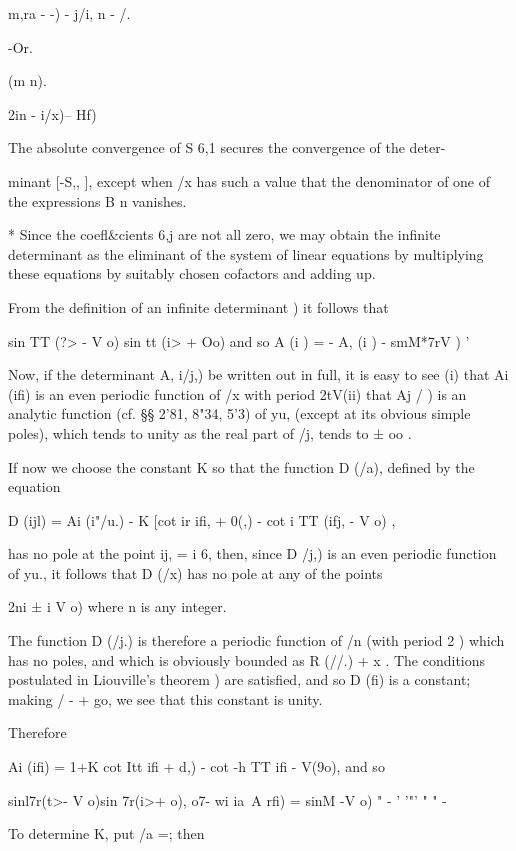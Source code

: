   m,ra - -) - j/i, n - /.

-Or.

(m n).

 2in - i/x)-- Hf)

The absolute convergence of S 6,1 secures the convergence of the
deter-

minant [-S,, ], except when /x has such a value that the denominator
of one of the expressions B n vanishes.

* Since the coefl\&cients 6,j are not all zero, we may obtain the
infinite determinant as the eliminant of the system of linear
equations by multiplying these equations by suitably chosen cofactors
and adding up.

%
%

From the definition of an infinite determinant ) it follows that

sin TT (?> - V o) sin tt (i> + \/Oo) and so A (i ) = - A, (i ) -
smM*7rV ) '

Now, if the determinant A, i/j,) be written out in full, it is easy to
see (i) that Ai (ifi) is an even periodic function of /x with period
2tV(ii) that Aj / ) is an analytic function (cf. §§ 2'81, 8"34, 5'3)
of yu, (except at its obvious simple poles), which tends to unity as
the real part of /j, tends to ± oo .

If now we choose the constant K so that the function D (/a), defined
by the equation

D (ijl) = Ai (i"/u.) - K [cot ir ifi, + \/0(,) - cot i TT (ifj, - V o)
,

has no pole at the point ij, = i 6, then, since D /j,) is an even
periodic function of yu., it follows that D (/x) has no pole at any of
the points

2ni ± i V o) where n is any integer.

The function D (/j.) is therefore a periodic function of /n (with
period 2 ) which has no poles, and which is obviously bounded as R
(//.) + x . The conditions postulated in Liouville's theorem )
are satisfied, and so D (fi) is a constant; making / - + go, we see
that this constant is unity.

Therefore

Ai (ifi) = 1+K cot Itt ifi + \/d,) - cot -h TT ifi - V(9o), and so

sinl7r(t>- V o)sin 7r(i>+\/ o), o7- wi ia\ A rfi) = sinM -V o) " - '
'"' " " -

To determine K, put /a =; then

